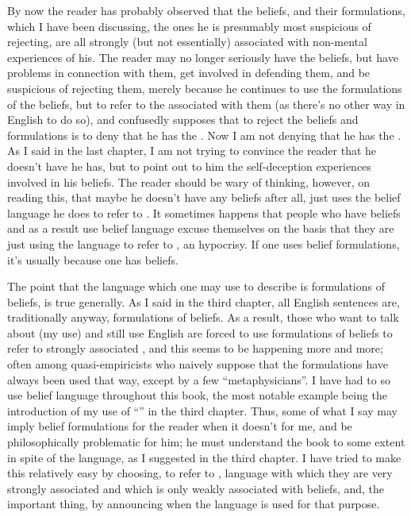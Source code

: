 By now the reader has probably observed that the beliefs, and their 
formulations, which I have been discussing, the ones he is presumably most 
suspicious of rejecting, are all strongly (but not essentially) associated with 
non-mental experiences of his. The reader may no longer seriously have the 
beliefs, but have problems in connection with them, get involved in 
defending them, and be suspicious of rejecting them, merely because he 
continues to use the formulations of the beliefs, but to refer to the 
 associated with them (as there's no other way in English to do 
so), and confusedly supposes that to reject the beliefs and formulations is to 
deny that he has the . Now I am not denying that he has the 
. As I said in the last chapter, I am not trying to convince the 
reader that he doesn't have  he has, but to point out to him the 
self-deception experiences involved in his beliefs. The reader should be wary 
of thinking, however, on reading this, that maybe he doesn't have any beliefs 
after all, just uses the belief language he does to refer to . It 
sometimes happens that people who have beliefs and as a result use belief 
language excuse themselves on the basis that they are just using the language 
to refer to , an hypocrisy. If one uses belief formulations, it's 
usually because one has beliefs. 

The point that the language which one may use to describe 
is formulations of beliefs, is true generally. As I said in the third chapter, all 
English sentences are, traditionally anyway, formulations of beliefs. As a 
result, those who want to talk about  (my use) and still use 
English are forced to use formulations of beliefs to refer to strongly 
associated , and this seems to be happening more and more; often 
among quasi-empiricists who naively suppose that the formulations have 
always been used that way, except by a few \enquote{metaphysicians}. I have had to 
so use belief language throughout this book, the most notable example being 
the introduction of my use of \enquote{} in the third chapter. Thus, some 
of what I say may imply belief formulations for the reader when it doesn't 
for me, and be philosophically problematic for him; he must understand the 
book to some extent in spite of the language, as I suggested in the third 
chapter. I have tried to make this relatively easy by choosing, to refer to 
, language with which they are very strongly associated and 
which is only weakly associated with beliefs, and, the important thing, by 
announcing when the language is used for that purpose. 

